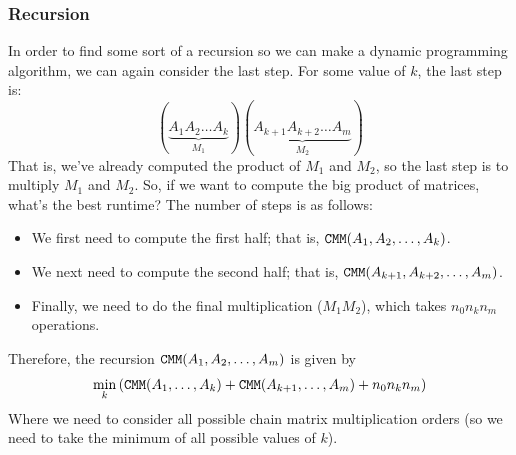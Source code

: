 \documentclass[letterpaper]{article}
\begin{document}
\subsubsection{Recursion}
In order to find some sort of a recursion so we can make a dynamic programming algorithm, we can again consider the last step. For some value of $k$, the last step is: 
\[(\underbrace{A_1 A_2 \dots A_k}_{M_1}) (\underbrace{A_{k + 1} A_{k + 2} \dots A_m}_{M_2})\]
That is, we've already computed the product of $M_1$ and $M_2$, so the last step is to multiply $M_1$ and $M_2$. So, if we want to compute the big product of matrices, what's the best runtime? The number of steps is as follows: 
\begin{itemize}
    \item We first need to compute the first half; that is, $\texttt{CMM}(A_1, A_2, \dots, A_k)$. 
    \item We next need to compute the second half; that is, $\texttt{CMM}(A_{k + 1}, A_{k + 2}, \dots, A_m)$. 
    \item Finally, we need to do the final multiplication ($M_1 M_2$), which takes $n_0 n_k n_m$ operations. 
\end{itemize}
Therefore, the recursion $\texttt{CMM}(A_1, A_2, \dots, A_m)$ is given by 
\[\min_{k}\left(\texttt{CMM}(A_1, \dots, A_k) + \texttt{CMM}(A_{k + 1}, \dots, A_m) + n_0 n_k n_m\right)\]
Where we need to consider all possible chain matrix multiplication orders (so we need to take the minimum of all possible values of $k$). 
\end{document}
